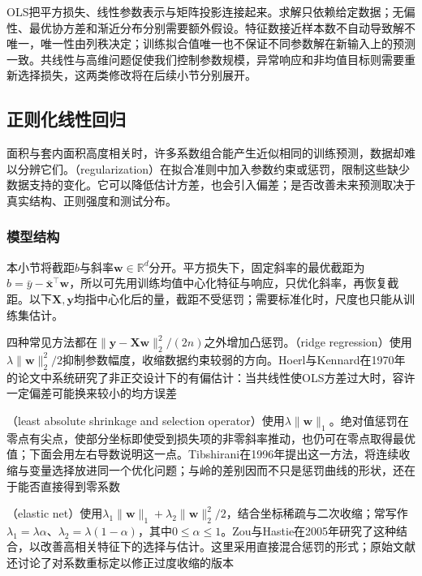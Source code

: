 OLS把平方损失、线性参数表示与矩阵投影连接起来。求解只依赖给定数据；无偏性、最优协方差和渐近分布分别需要额外假设。特征数接近样本数不自动导致解不唯一，唯一性由列秩决定；训练拟合值唯一也不保证不同参数解在新输入上的预测一致。共线性与高维问题促使我们控制参数规模，异常响应和非均值目标则需要重新选择损失，这两类修改将在后续小节分别展开。

\subsection{正则化线性回归}
\label{sec:regression-regularization}

面积与套内面积高度相关时，许多系数组合能产生近似相同的训练预测，数据却难以分辨它们。（regularization）在拟合准则中加入参数约束或惩罚，限制这些缺少数据支持的变化。它可以降低估计方差，也会引入偏差；是否改善未来预测取决于真实结构、正则强度和测试分布。

\subsubsection{模型结构}
\label{sec:regression-penalties}

本小节将截距$b$与斜率$\bm{w}\in\mathbb{R}^d$分开。平方损失下，固定斜率的最优截距为$b=\bar y-\bar{\bm{x}}^{\top}\bm{w}$，所以可先用训练均值中心化特征与响应，只优化斜率，再恢复截距。以下$\bm{X},\bm{y}$均指中心化后的量，截距不受惩罚；需要标准化时，尺度也只能从训练集估计。

四种常见方法都在$\lVert\bm{y}-\bm{X}\bm{w}\rVert_2^2/(2n)$之外增加凸惩罚。（ridge regression）使用$\lambda\lVert\bm{w}\rVert_2^2/2$抑制参数幅度，收缩数据约束较弱的方向。Hoerl与Kennard在1970年的论文中系统研究了非正交设计下的有偏估计：当共线性使OLS方差过大时，容许一定偏差可能换来较小的均方误差

（least absolute shrinkage and selection operator）使用$\lambda\lVert\bm{w}\rVert_1$。绝对值惩罚在零点有尖点，使部分坐标即使受到损失项的非零斜率推动，也仍可在零点取得最优值；下面会用左右导数说明这一点。Tibshirani在1996年提出这一方法，将连续收缩与变量选择放进同一个优化问题；与岭的差别因而不只是惩罚曲线的形状，还在于能否直接得到零系数

（elastic net）使用$\lambda_1\lVert\bm{w}\rVert_1+\lambda_2\lVert\bm{w}\rVert_2^2/2$，结合坐标稀疏与二次收缩；常写作$\lambda_1=\lambda\alpha$、$\lambda_2=\lambda(1-\alpha)$，其中$0\leq\alpha\leq1$。Zou与Hastie在2005年研究了这种结合，以改善高相关特征下的选择与估计。这里采用直接混合惩罚的形式；原始文献还讨论了对系数重标定以修正过度收缩的版本

